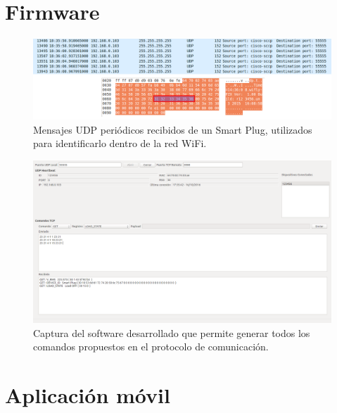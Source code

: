 \section{Firmware}

\begin{figure}[h]
	\centering
	\includegraphics[width=12cm]{./Figures/4_1_2_mensajes_udp.png}
	\caption{Mensajes UDP periódicos recibidos de un Smart Plug, utilizados para identificarlo dentro de la red WiFi.}
	\label{fig:mensajes_udp}
\end{figure}

\begin{figure}[h]
	\centering
	\includegraphics[width=14cm]{./Figures/4_1_2_simulador_tcp.png}
	\caption{Captura del software desarrollado que permite generar todos los comandos propuestos en el protocolo de comunicación.}
	\label{fig:simulador_tcp}
\end{figure}

\section{Aplicación móvil}

